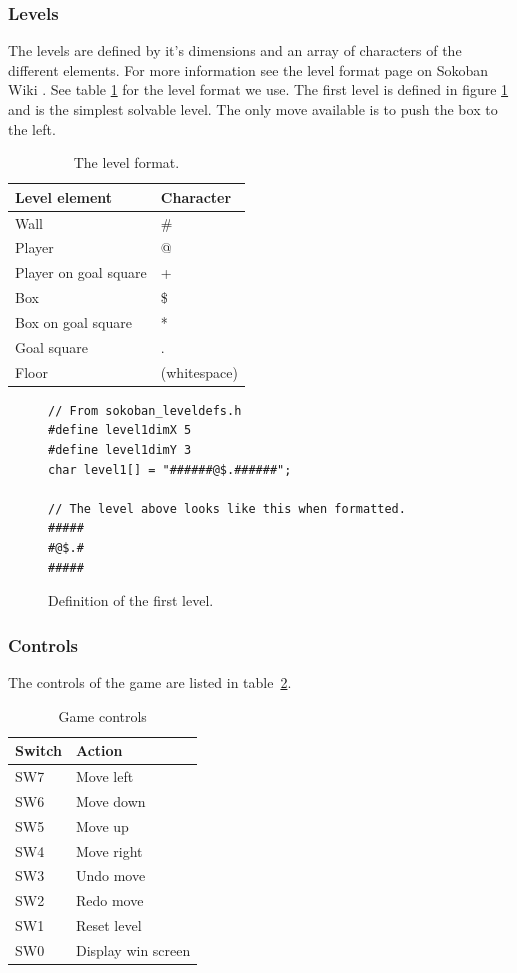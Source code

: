 \documentclass[a4paper,11pt]{article}
\begin{document}
\subsubsection{Levels}
The levels are defined by it's dimensions and an array of characters of the different elements. For more information see the level format page on Sokoban Wiki \cite{sokobanlevel}. See table \ref{tab:levelformat} for the level format we use. The first level is defined in figure \ref{fig:leveldef} and is the simplest solvable level. The only move available is to push the box to the left.

\begin{table}
\centering
\begin{tabular}{|l|l|}
\hline \textbf{Level element} & \textbf{Character} \\ 
\hline Wall & \# \\ 
\hline Player & @ \\ 
\hline Player on goal square & + \\ 
\hline Box & \$ \\ 
\hline Box on goal square & * \\ 
\hline Goal square & . \\ 
\hline Floor & (whitespace) \\ 
\hline 
\end{tabular}
\caption{The level format.}
\label{tab:levelformat}
\end{table}

\begin{figure}
\begin{lstlisting}
// From sokoban_leveldefs.h
#define level1dimX 5
#define level1dimY 3
char level1[] = "######@$.######";

// The level above looks like this when formatted.
#####
#@$.#
#####
\end{lstlisting}
\caption{Definition of the first level.}
\label{fig:leveldef}
\end{figure}

\subsubsection{Controls}
The controls of the game are listed in table~\ref{tab:gamecontrols}. 
\begin{table}
\centering
\begin{tabular}{|l|l|}
\hline \textbf{Switch} & \textbf{Action} \\ 
\hline SW7 & Move left \\ 
\hline SW6 & Move down \\ 
\hline SW5 & Move up \\ 
\hline SW4 & Move right \\ 
\hline SW3 & Undo move \\ 
\hline SW2 & Redo move \\ 
\hline SW1 & Reset level \\ 
\hline SW0 & Display win screen \\ 
\hline 
\end{tabular}
\caption{Game controls} 
\label{tab:gamecontrols}
\end{table}
\end{document}
